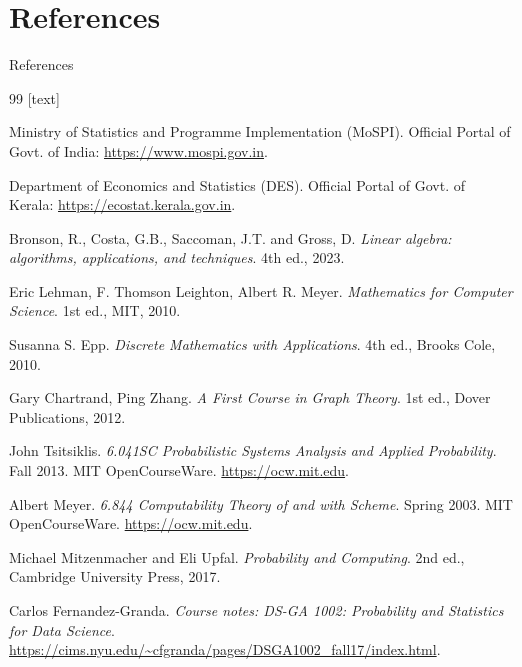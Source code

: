 \documentclass[10pt, aspectratio=169]{beamer}
\begin{document}
\section{References}

\begin{frame}[allowframebreaks]{References}
    \begin{thebibliography}{99}
        [text]
        
        Ministry of Statistics and Programme Implementation (MoSPI).
        \newblock Official Portal of Govt. of India: \url{https://www.mospi.gov.in}.

        Department of Economics and Statistics (DES).
        \newblock Official Portal of Govt. of Kerala: \url{https://ecostat.kerala.gov.in}.
        
        Bronson, R., Costa, G.B., Saccoman, J.T. and Gross, D.
        \newblock \emph{Linear algebra: algorithms, applications, and techniques}. 4th ed., 2023.
        
        Eric Lehman, F. Thomson Leighton, Albert R. Meyer.
        \newblock \emph{Mathematics for Computer Science}. 1st ed., MIT, 2010.
        
        Susanna S. Epp.
        \newblock \emph{Discrete Mathematics with Applications}. 4th ed., Brooks Cole, 2010.
        
        Gary Chartrand, Ping Zhang.
        \newblock \emph{A First Course in Graph Theory}. 1st ed., Dover Publications, 2012.
        
        John Tsitsiklis.
        \newblock \emph{6.041SC Probabilistic Systems Analysis and Applied Probability}. Fall 2013. MIT OpenCourseWare. \url{https://ocw.mit.edu}.
        
        Albert Meyer.
        \newblock \emph{6.844 Computability Theory of and with Scheme}. Spring 2003. MIT OpenCourseWare. \url{https://ocw.mit.edu}.
        
        Michael Mitzenmacher and Eli Upfal.
        \newblock \emph{Probability and Computing}. 2nd ed., Cambridge University Press, 2017.
        
        Carlos Fernandez-Granda.
        \newblock \emph{Course notes: DS-GA 1002: Probability and Statistics for Data Science}. \url{https://cims.nyu.edu/~cfgranda/pages/DSGA1002_fall17/index.html}.
        
    \end{thebibliography}
\end{frame}
\end{document}
